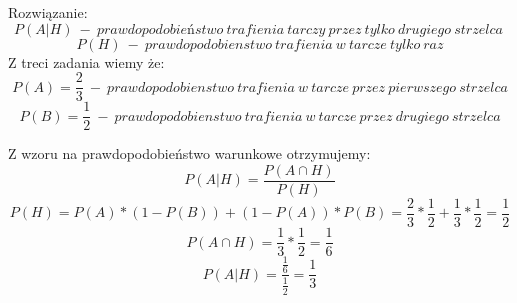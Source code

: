 
Rozwiązanie:
$$
P(A|H) \ - \ prawdopodobieństwo \ trafienia \ tarczy \ przez \ tylko \ drugiego \ strzelca \
$$
$$
P(H) \ - \ prawdopodobienstwo \ trafienia \ w \ tarcze \ tylko \ raz
$$
Z treci zadania wiemy że:
$$
P(A) = \frac{2}{3} \ - \ prawdopodobienstwo \ trafienia \ w \ tarcze \ przez \ pierwszego \ strzelca
$$
$$
P(B) = \frac{1}{2} \ - \ prawdopodobienstwo \ trafienia \ w \ tarcze \ przez \ drugiego \ strzelca
$$

Z wzoru na prawdopodobieństwo warunkowe otrzymujemy:
$$
P(A|H) = \frac{P(A \cap H)}{P(H)}
$$
$$
P(H) = P(A) * (1 - P(B)) + (1 - P(A)) * P(B) = \frac{2}{3} * \frac{1}{2} + \frac{1}{3} * \frac{1}{2} = \frac{1}{2}
$$
$$
P(A \cap H) = \frac{1}{3} * \frac{1}{2} = \frac{1}{6}
$$
$$
P(A|H) = \frac{\frac{1}{6}}{\frac{1}{2}} = \frac{1}{3}
 $$
